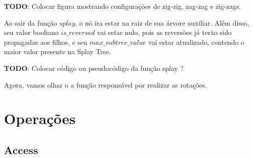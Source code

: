\begin{center}
    \textbf{TODO}: Colocar figura mostrando configurações de zig-zig, zag-zag e zig-zags.
\end{center}

Ao sair da função $splay$, o nó ira estar na raiz de sua árvore auxiliar. Além disso, seu valor booliano $is\_reversed$ vai estar nulo, pois as reversões já terão sido propagadas aos filhos, e seu $max\_subtree\_value$ vai estar atualizado, contendo o maior valor presente na Splay Tree.

\begin{center}
    \textbf{TODO}: Colocar código ou pseudocódigo da função splay ?
\end{center}

Agora, vamos olhar o a função responsável por realizar as rotações.

\section{Operações}
\label{sec:lct-operacoes}

\subsection{Access}
\label{subsection:lct-access}